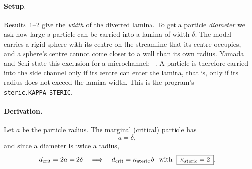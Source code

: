 \label{res:steric-two}

\paragraph{Setup.} Results~1--2 give the \emph{width} of the diverted lamina. To get a
particle \emph{diameter} we ask how large a particle can be carried into a lamina of width
$\delta$. The model carries a rigid sphere with its centre on the streamline that its centre
occupies, and a sphere's centre cannot come closer to a wall than its own radius. Yamada and
Seki state this exclusion for a microchannel:
~\cite[p.~1234]{b15}.
A particle is therefore carried into the side channel only if its centre can enter the
lamina, that is, only if its radius does not exceed the lamina width. This is the program's
\texttt{steric.KAPPA\_STERIC}.

\paragraph{Derivation.} Let $a$ be the particle radius. The marginal (critical) particle has
\begin{equation}
a = \delta ,
\end{equation}
and since a diameter is twice a radius,
\begin{equation}
d_{\mathrm{crit}} = 2a = 2\delta \quad\Longrightarrow\quad d_{\mathrm{crit}} = \kappa_{\mathrm{steric}}\,\delta \ \ \text{with}\ \ \boxed{\,\kappa_{\mathrm{steric}} = 2\,}.
\label{eq:r5}
\end{equation}

